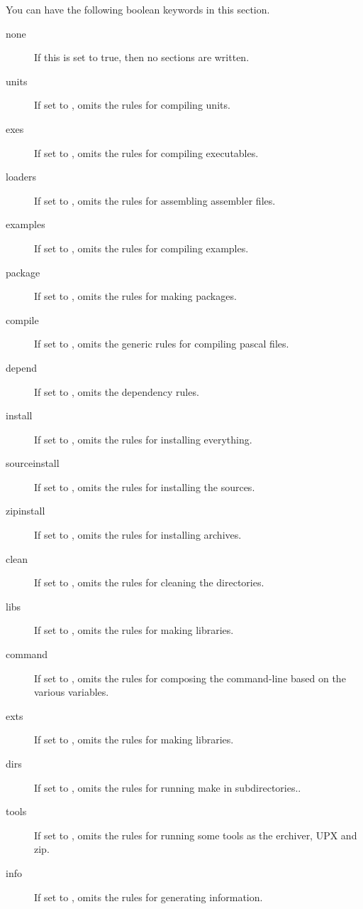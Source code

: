 You can have the following boolean keywords in this section.
\begin{description}
\item[none]
If this is set to true, then no sections are written.
\item[units]
If set to ,  omits the rules for compiling units.
\item[exes]
If set to ,  omits the rules for compiling executables.
\item[loaders]
If set to ,  omits the rules for assembling assembler files.
\item[examples]
If set to ,  omits the rules for compiling examples.
\item[package]
If set to ,  omits the rules for making packages.
\item[compile]
If set to ,  omits the generic rules for compiling pascal files.
\item[depend]
If set to ,  omits the dependency rules.
\item[install]
If set to ,  omits the rules for installing everything.
\item[sourceinstall]
If set to ,  omits the rules for installing the sources.
\item[zipinstall]
If set to ,  omits the rules for installing archives.
\item[clean]
If set to ,  omits the rules for cleaning the directories.
\item[libs]
If set to ,  omits the rules for making libraries.
\item[command]
If set to ,  omits the rules for composing the command-line based on the various
variables.
\item[exts]
If set to ,  omits the rules for making libraries.
\item[dirs]
If set to ,  omits the rules for running make in subdirectories..
\item[tools]
If set to ,  omits the rules for running some tools as the erchiver, UPX and zip.
\item[info]
If set to ,  omits the rules for generating information.
\end{description}

